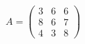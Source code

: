 \documentclass[12pt]{article}
\begin{document}
$ \begin{equation*}    A =     \begin{pmatrix}    3 & 6 & 6 \\    8 & 6 & 7 \\    4  & 3  & 8     \end{pmatrix}    \end{equation*} $
\end{document}
